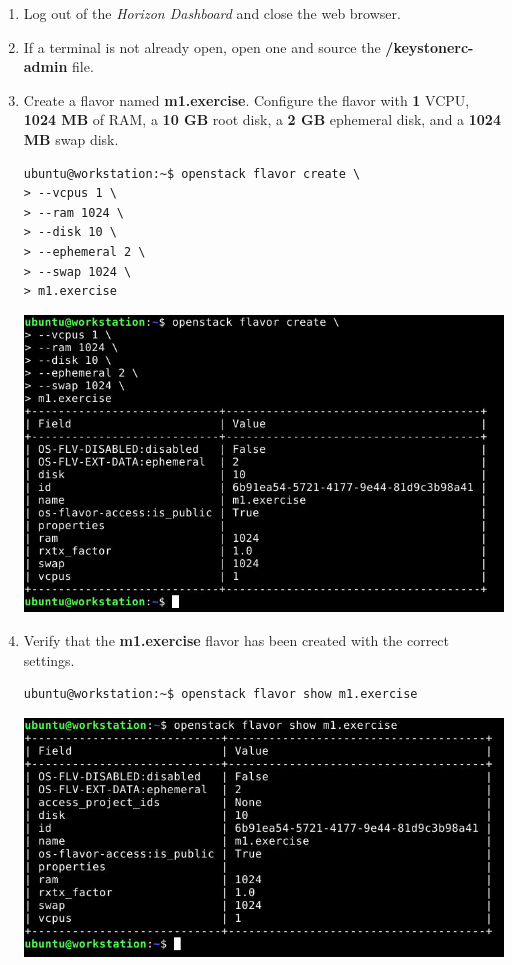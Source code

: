 \documentclass[letterpaper, 12pt]{article}
\begin{document}
\begin{enumerate}
    \item Log out of the \textit{Horizon Dashboard} and close the web browser.
    
    \item If a terminal is not already open, open one and source the \textbf{\texttildemid/keystonerc-admin} file.
    
    \item Create a flavor named \textbf{m1.exercise}. Configure the flavor with \textbf{1} VCPU, \textbf{1024 MB} of RAM, a
    \textbf{10 GB} root disk, a \textbf{2 GB} ephemeral disk, and a \textbf{1024 MB} swap disk.
\begin{lstlisting}
ubuntu@workstation:~$ openstack flavor create \
> --vcpus 1 \
> --ram 1024 \
> --disk 10 \
> --ephemeral 2 \
> --swap 1024 \
> m1.exercise
\end{lstlisting}

    \begin{center}
        \includegraphics[width=\linewidth]{images/part2/step6.png}
    \end{center}

    \item Verify that the \textbf{m1.exercise} flavor has been created with the correct settings.
\begin{lstlisting}
ubuntu@workstation:~$ openstack flavor show m1.exercise
\end{lstlisting}

    \begin{center}
        \includegraphics[width=\linewidth]{images/part2/step7.png}
    \end{center}


\end{enumerate}
\end{document}
